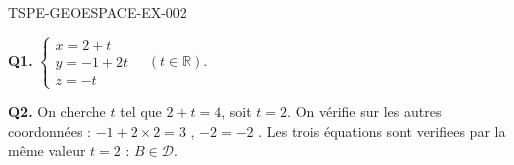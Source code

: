 \begin{corrige}{TSPE-GEOESPACE-EX-002}

\textbf{Q1.} $\begin{cases}x=2+t\\y=-1+2t\\z=-t\end{cases} \quad (t\in\mathbb{R})$.

\textbf{Q2.} On cherche $t$ tel que $2+t=4$, soit $t=2$. On vérifie sur les autres coordonnées : $-1+2\times2=3$ \checkmark, $-2=-2$ \checkmark. Les trois équations sont verifiees par la même valeur $t=2$ : $B \in \mathcal{D}$.

\end{corrige}
